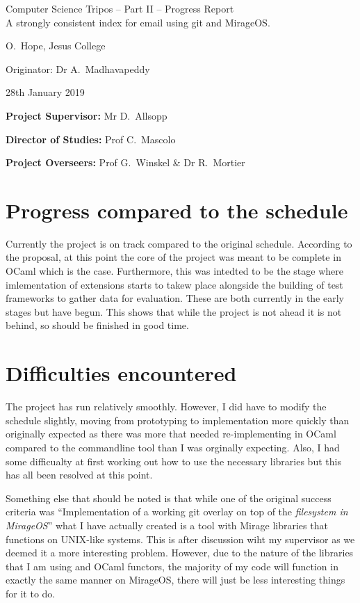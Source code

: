 \documentclass[12pt,a4paper,twoside]{article}
\begin{document}
\begin{center}
    \Large
    Computer Science Tripos -- Part II -- Progress Report\\[4mm]
    \LARGE
    A strongly consistent index for email using git and MirageOS.

    \large
    O.~Hope, Jesus College

    Originator: Dr A.~Madhavapeddy

    28th January 2019
\end{center}

\vspace{5mm}

\textbf{Project Supervisor:} Mr D.~Allsopp

\textbf{Director of Studies:} Prof C.~Mascolo

\textbf{Project Overseers:} Prof G.~Winskel \& Dr R.~Mortier


\section*{Progress compared to the schedule}

Currently the project is on track compared to the original schedule. According to the proposal, at this point the core of the project was meant to be complete in OCaml which is the case. Furthermore, this was intedted to be the stage where imlementation of extensions starts to takew place alongside the building of test frameworks to gather data for evaluation. These are both currently in the early stages but have begun. This shows that while the project is not ahead it is not behind, so should be finished in good time.

\section*{Difficulties encountered}

The project has run relatively smoothly. However, I did have to modify the schedule slightly, moving from prototyping to implementation more quickly than originally expected as there was more that needed re-implementing in OCaml compared to the commandline tool than I was orginally expecting. Also, I had some difficualty at first working out how to use the necessary libraries but this has all been resolved at this point.

Something else that should be noted is that while one of the original success criteria was ``Implementation of a working git overlay on top of the \emph{filesystem in MirageOS}'' what I have actually created is a tool with Mirage libraries that functions on UNIX-like systems. This is after discussion wiht my supervisor as we deemed it a more interesting problem. However, due to the nature of the libraries that I am using and OCaml functors, the majority of my code will function in exactly the same manner on MirageOS, there will just be less interesting things for it to do.
\end{document}
